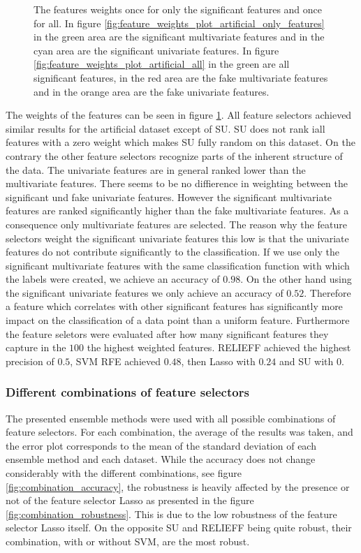 \documentclass[twoside,11pt]{article}
\begin{document}
\begin{figure}
  \caption{The features weights  once for only the significant features and once for all. In figure \ref{fig:feature_weights_plot_artificial_only_features} in the green area are the significant multivariate features and in the cyan area are the significant univariate features. In figure \ref{fig:feature_weights_plot_artificial_all} in the green are all significant features, in the red area are the fake multivariate features and in the orange area are the fake univariate features. }
  \label{fig:feature_weights_plot_artificial}
\end{figure}
The weights of the features can be seen in figure \ref{fig:feature_weights_plot_artificial}.
All feature selectors achieved similar results for the artificial dataset except of SU. SU does not rank iall features with a zero weight which makes SU fully random on this dataset. On the contrary the other feature selectors recognize parts of the inherent structure of the data. The univariate features are in general ranked lower than the multivariate features. There seems to be no diffierence in weighting between the significant und fake univariate features. However the significant multivariate features are ranked significantly higher than the fake multivariate features. As a consequence only multivariate features are selected. The reason why the feature selectors weight the significant univariate features this low is that the univariate features do not contribute significantly to the classification. If we use only the significant multivariate features with the same classification function with which the labels were created, we achieve an accuracy of $0.98$. On the other hand using the significant univariate features we only achieve an accuracy of $0.52$. Therefore a feature which correlates with other significant features has significantly more impact on the classification of a data point than a uniform feature.
Furthermore the feature seletors were evaluated after how many significant features they capture in the $100$ the highest weighted features. RELIEFF achieved the highest precision of $0.5$, SVM RFE achieved $0.48$, then Lasso with $0.24$ and SU with $0$.

\subsubsection{Different combinations of feature selectors}
The presented ensemble methods were used with all possible combinations of feature selectors. For each combination, the average of the results was taken, and the error plot corresponds to the mean of the standard deviation of each ensemble method and each dataset. While the accuracy does not change considerably with the different combinations, see figure \ref{fig:combination_accuracy}, the robustness is heavily affected by the presence or not of the feature selector Lasso as presented in the figure \ref{fig:combination_robustness}. This is due to the low robustness of the feature selector Lasso itself. On the opposite SU and RELIEFF being quite robust, their combination, with or without SVM, are the most robust.  
\end{document}
